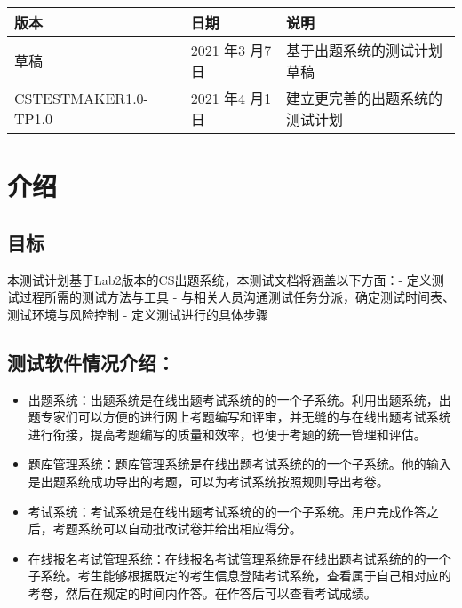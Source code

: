 \documentclass[hyperref, a4paper]{ctexart}
\providecommand{\tightlist}{%
  \setlength{\itemsep}{0pt}\setlength{\parskip}{0pt}}
\begin{document}
\begin{tabular}{|p{2cm}|p{3.3cm}|p{5cm}|}
\hline
版本 & 日期 & 说明\\
\hline
草稿 & 2021 年3 月7 日 & 基于出题系统的测试计划草稿\\
\hline
CSTESTMAKER1.0-TP1.0 & 2021 年4 月1 日 & 建立更完善的出题系统的测试计划\\
\hline
\end{tabular}

\hypertarget{ux4ecbux7ecd}{%
\section{介绍}\label{ux4ecbux7ecd}}

\hypertarget{ux76eeux6807}{%
\subsection{目标}\label{ux76eeux6807}}

本测试计划基于Lab2版本的CS出题系统，本测试文档将涵盖以下方面：\newline -
定义测试过程所需的测试方法与工具 -
与相关人员沟通测试任务分派，确定测试时间表、测试环境与风险控制 -
定义测试进行的具体步骤

\hypertarget{ux6d4bux8bd5ux8f6fux4ef6ux60c5ux51b5ux4ecbux7ecd}{%
\subsection{测试软件情况介绍：}\label{ux6d4bux8bd5ux8f6fux4ef6ux60c5ux51b5ux4ecbux7ecd}}

\begin{itemize}
\tightlist
\item
  出题系统：出题系统是在线出题考试系统的的⼀个⼦系统。利⽤出题系统，出题专家们可以⽅便的进⾏⽹上考题编写和评审，并⽆缝的与在线出题考试系统进⾏衔接，提⾼考题编写的质量和效率，也便于考题的统⼀管理和评估。
\item
  题库管理系统：题库管理系统是在线出题考试系统的的⼀个⼦系统。他的输⼊是出题系统成功导出的考题，可以为考试系统按照规则导出考卷。
\item
  考试系统：考试系统是在线出题考试系统的的⼀个⼦系统。用户完成作答之后，考题系统可以自动批改试卷并给出相应得分。
\item
  在线报名考试管理系统：在线报名考试管理系统是在线出题考试系统的的⼀个⼦系统。考生能够根据既定的考生信息登陆考试系统，查看属于自己相对应的考卷，然后在规定的时间内作答。在作答后可以查看考试成绩。
\end{itemize}
\end{document}
